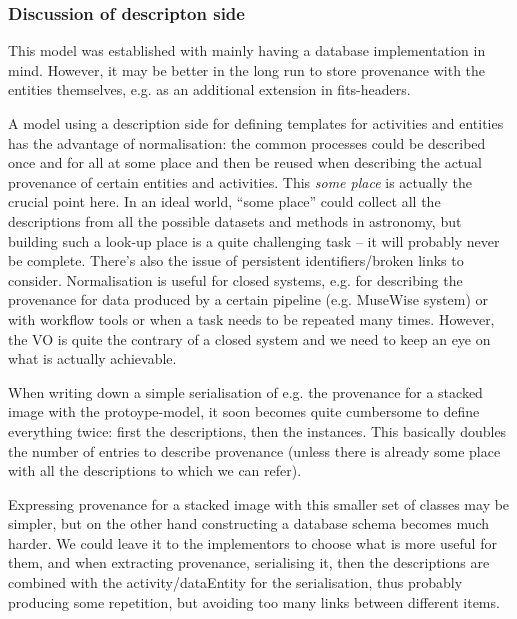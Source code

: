 \subsubsection{Discussion of descripton side}
This model was established with mainly having a database implementation in mind. 
However, it may be better in the long run to store provenance with 
the entities themselves, e.g. as an additional extension in fits-headers.

A model using a description side for defining templates for activities and
entities has the advantage of normalisation: the common processes could be 
described once and for all at some place and then be reused when describing 
the actual provenance of certain entities and activities. This \emph{some place} 
is actually the crucial point here.
In an ideal world, ``some place'' could collect all the descriptions from all 
the possible datasets and methods in astronomy, but building such a look-up place 
is a quite challenging task -- it will probably never be complete. There's also 
the issue of persistent identifiers/broken links to consider.
Normalisation is useful for closed systems, e.g. for describing the provenance 
for data produced by a certain pipeline (e.g. MuseWise system) or with 
workflow tools or when a task needs to be repeated many times. However, the VO 
is quite the contrary of a closed system and we need to keep an eye on what is 
actually achievable.

When writing down a simple serialisation of e.g. the provenance for a stacked 
image with the protoype-model, it soon becomes quite cumbersome to define 
everything twice: first the descriptions, then the instances. This basically 
doubles the number of entries to describe provenance (unless there is already 
some place with all the descriptions to which we can refer).

Expressing provenance for a stacked image with this smaller set of classes may 
be simpler, but on the other hand constructing a database schema becomes much 
harder. 
We could leave it to the implementors to choose what is more useful for them, 
and when extracting provenance, serialising it, then the descriptions are 
combined with the activity/dataEntity for 
the serialisation, thus probably producing some repetition, but avoiding too 
many links between different items.



